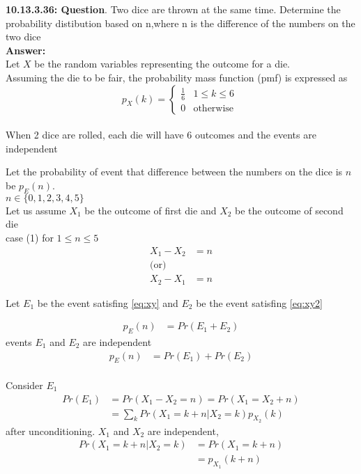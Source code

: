 \documentclass[journal,12pt,twocolumn]{IEEEtran}
\begin{document}
\textbf{10.13.3.36: Question}. Two dice are thrown at the same time. Determine the probability distibution based on n,where n is the difference
of the numbers on the two dice \\
\textbf{Answer: }\\
Let $X$  be the random variables representing the outcome for a die.\\
Assuming the die to be fair, the probability mass function (pmf) is expressed as
 \begin{equation}
p_{X}(k) =  
\begin{cases}
    \frac{1}{6} &  1\leq  k\leq 6  \\
    0  & \text{otherwise } 
\end{cases}
\label{eq:1}
\end{equation}\\

When 2 dice are rolled, each die will have 6 outcomes and the events are independent 

Let the probability of event that difference between the numbers on the dice is $n$ be $p_E(n)$.\\

$n\in \{0,1,2,3,4,5\}$\\
Let us assume $X_1$ be the outcome of first die and $X_2$ be the outcome of second die\\

case (1)
for $1\leq  n\leq 5$
\begin{align}
    X_1 - X_2 &= n \label{eq:xy} \\
    \text{(or)} \nonumber \\
    X_2 - X_1 &= n \label{eq:xy2} 
\end{align}

Let $E_1$ be the event satisfing \eqref{eq:xy} and $E_2$ be the event satisfing \eqref{eq:xy2}

\begin{align}
	p_E(n)&=Pr(E_1+E_2) \nonumber
\end{align} 
events $E_1$ and $E_2$ are independent
\begin{align}
	p_E(n)&=Pr(E_1)+Pr(E_2) \nonumber
\end{align} \\

Consider $E_1$
\begin{align}
    Pr(E_1) &= Pr (X_1-X_2 = n) = Pr (X_1 = X_2+n )\nonumber\\
   	&=\sum_{k} Pr(X_1=k+n|X_2=k)p_{X_{2}}(k)\label{eq:3}
\end{align}
after unconditioning. $X_1$ and $X_2$ are independent,
\begin{align}
	Pr(X_1=k+n|X_2=k)&=Pr(X_1=k+n)\nonumber\\
                &=p_{X_{1}}(k+n)\label{eq:4}
\end{align} 
\end{document}
